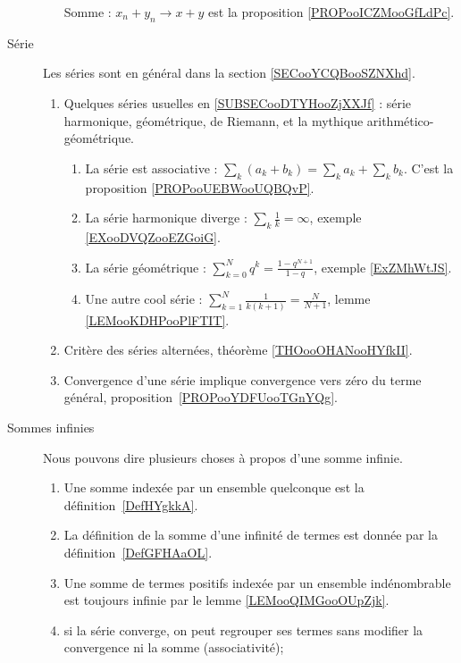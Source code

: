 \begin{description}
\begin{enumerate}
                Somme : \( x_n+y_n\to x+y\) est la proposition \ref{PROPooICZMooGfLdPc}.
        \end{enumerate}
    \item[Série] 
        Les séries sont en général dans la section \ref{SECooYCQBooSZNXhd}.
        \begin{enumerate}
    \item
        Quelques séries usuelles en \ref{SUBSECooDTYHooZjXXJf} : série harmonique, géométrique, de Riemann, et la mythique arithmético-géométrique.
        \begin{enumerate}
            \item
                La série est associative : \( \sum_k(a_k+b_k)=\sum_ka_k+\sum_kb_k\). C'est la proposition \ref{PROPooUEBWooUQBQvP}.
            \item
                La série harmonique diverge : \( \sum_k\frac{1}{ k }=\infty\), exemple \ref{EXooDVQZooEZGoiG}.
            \item
                La série géométrique : \( \sum_{k=0}^Nq^k=\frac{ 1-q^{N+1} }{ 1-q }\), exemple \ref{ExZMhWtJS}.
            \item
                Une autre cool série : \( \sum_{k=1}^N\frac{ 1 }{ k(k+1) }=\frac{ N }{ N+1 }\), lemme \ref{LEMooKDHPooPlFTIT}.
        \end{enumerate}
    \item
        Critère des séries alternées, théorème \ref{THOooOHANooHYfkII}.
    \item
        Convergence d'une série implique convergence vers zéro du terme général, proposition~\ref{PROPooYDFUooTGnYQg}.
        \end{enumerate}
    \item[Sommes infinies]
        Nous pouvons dire plusieurs choses à propos d'une somme infinie.%
        \begin{enumerate}
            \item
Une somme indexée par un ensemble quelconque est la définition~\ref{DefHYgkkA}.
    \item
        La définition de la somme d'une infinité de termes est donnée par la définition~\ref{DefGFHAaOL}.
    \item
        Une somme de termes positifs indexée par un ensemble indénombrable est toujours infinie par le lemme \ref{LEMooQIMGooOUpZjk}.
  \item
      si la série converge, on peut regrouper ses termes sans modifier la convergence ni la somme (associativité);

\end{enumerate}
\end{description}
